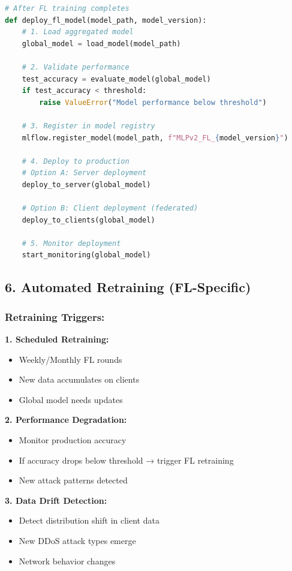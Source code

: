 \documentclass[12pt]{article}
\begin{document}
\begin{lstlisting}[language=Python]
# After FL training completes
def deploy_fl_model(model_path, model_version):
    # 1. Load aggregated model
    global_model = load_model(model_path)
    
    # 2. Validate performance
    test_accuracy = evaluate_model(global_model)
    if test_accuracy < threshold:
        raise ValueError("Model performance below threshold")
    
    # 3. Register in model registry
    mlflow.register_model(model_path, f"MLPv2_FL_{model_version}")
    
    # 4. Deploy to production
    # Option A: Server deployment
    deploy_to_server(global_model)
    
    # Option B: Client deployment (federated)
    deploy_to_clients(global_model)
    
    # 5. Monitor deployment
    start_monitoring(global_model)
\end{lstlisting}

\subsection{6. Automated Retraining (FL-Specific)}

\subsubsection{Retraining Triggers:}

\textbf{1. Scheduled Retraining:}
\begin{itemize}
    \item Weekly/Monthly FL rounds
    \item New data accumulates on clients
    \item Global model needs updates
\end{itemize}

\textbf{2. Performance Degradation:}
\begin{itemize}
    \item Monitor production accuracy
    \item If accuracy drops below threshold → trigger FL retraining
    \item New attack patterns detected
\end{itemize}

\textbf{3. Data Drift Detection:}
\begin{itemize}
    \item Detect distribution shift in client data
    \item New DDoS attack types emerge
    \item Network behavior changes
\end{itemize}
\end{document}
